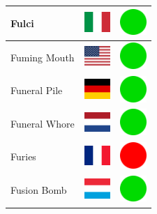 \documentclass[12pt, a4paper, twoside]{report}
\begin{document}
\begin{center}
\begin{longtable}{|p{5cm}|p{2cm}|p{2cm}|}
 Fulci                                                      & \includegraphics[width=1cm]{../img/flags/it} &   \includegraphics[width=1cm]{../likes/y} \\ \hline
 Fuming Mouth                                               & \includegraphics[width=1cm]{../img/flags/us} &   \includegraphics[width=1cm]{../likes/y} \\ \hline
 Funeral Pile                                               & \includegraphics[width=1cm]{../img/flags/de} &   \includegraphics[width=1cm]{../likes/y} \\ \hline
 Funeral Whore                                              & \includegraphics[width=1cm]{../img/flags/nl} &   \includegraphics[width=1cm]{../likes/y} \\ \hline
 Furies                                                     & \includegraphics[width=1cm]{../img/flags/fr} &   \includegraphics[width=1cm]{../likes/n} \\ \hline
 Fusion Bomb                                                & \includegraphics[width=1cm]{../img/flags/lu} &   \includegraphics[width=1cm]{../likes/y} \\ \hline

\end{longtable}
\end{center}
\end{document}
